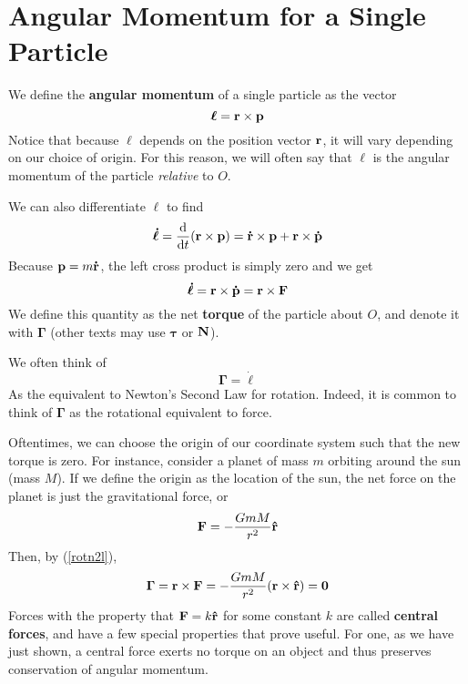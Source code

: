 \section{Angular Momentum for a Single Particle}
We define the \textbf{angular momentum} of a single particle as the vector
\[ \bm{\ell} = \mathbf{r} \times \mathbf{p}\]
Notice that because $\bm\ell$ depends on the position vector $\mathbf{r}$, it will vary depending on our choice of origin. For this reason, we will often say that $\bm\ell$ is the angular momentum of the particle \textit{relative} to $O$.

We can also differentiate $\ell$ to find
\[ \bm{\dot \ell} = \dv{t} (\mathbf{r}\times\mathbf{p}) = \mathbf{\dot r}\times \mathbf{p} + \mathbf{r}\times\mathbf{\dot p} \]
Because $\mathbf{p} = m\mathbf{\dot r}$, the left cross product is simply zero and we get
\[ \bm{\dot \ell} = \mathbf{r}\times\mathbf{\dot p} = \mathbf{r}\times\mathbf{F} \]
We define this quantity as the net \textbf{torque} of the particle about $O$, and denote it with $\bm{\Gamma}$ (other texts may use $\bm{\tau}$ or $\mathbf{N}$). 

We often think of
\begin{equation} \label{rotn2l}
    \bm{\Gamma} = \bm{\dot \ell}
\end{equation}
As the equivalent to Newton's Second Law for rotation. Indeed, it is common to think of $\bm{\Gamma}$ as the rotational equivalent to force. 

Oftentimes, we can choose the origin of our coordinate system such that the new torque is zero. For instance, consider a planet of mass $m$ orbiting around the sun (mass $M$). If we define the origin as the location of the sun, the net force on the planet is just the gravitational force, or
\[ \mathbf{F} = -\frac{GmM}{r^2}\mathbf{\hat{r}} \]
Then, by (\ref{rotn2l}),
\[ \bm{\Gamma} = \mathbf{r} \times \mathbf{F} = -\frac{GmM}{r^2} (\mathbf{r}\times\mathbf{\hat{r}}) = \mathbf{0}\]
Forces with the property that $\mathbf{F} = k\mathbf{\hat{r}}$ for some constant $k$ are called \textbf{central forces}, and have a few special properties that prove useful. For one, as we have just shown, a central force exerts no torque on an object and thus preserves conservation of angular momentum. 

